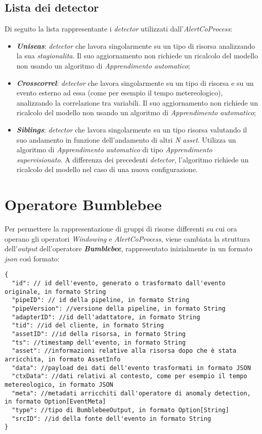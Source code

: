 \subsection{Lista dei detector}\label{sec:detector-alertcoprocess}
Di seguito la lista rappresentante i \textit{detector} utilizzati dall'\textit{AlertCoProcess}:
\begin{itemize}
	\item{\textbf{\textit{Uniseas}}: \textit{detector} che lavora singolarmente su un tipo di risorsa analizzando la sua \textit{\gls{stagionalita}}. Il suo aggiornamento non richiede un ricalcolo del modello non usando un algoritmo di \textit{\gls{Apprendimento automatico}};}
	\item{\textbf{\textit{Crosscorrel}}: \textit{detector} che lavora singolarmente su un tipo di risorsa e su un evento esterno ad essa (come per esempio il tempo metereologico), analizzando la correlazione tra variabili. Il suo aggiornamento non richiede un ricalcolo del modello non usando un algoritmo di \textit{\gls{Apprendimento automatico}};}
	\item{\textbf{\textit{Siblings}}: \textit{detector} che lavora singolarmente su un tipo risorsa valutando il suo andamento in funzione dell'andamento di altri \textit{N} \textit{asset}. Utilizza un algoritmo di \textit{\gls{Apprendimento automatico}} di tipo \textit{\gls{Apprendimento supervisionato}}. A differenza dei precedenti \textit{detector}, l'algoritmo richiede un ricalcolo del modello nel caso di una nuova configurazione.}
\end{itemize}


\section{Operatore Bumblebee}\label{sec:bbout}
Per permettere la rappresentazione di gruppi di risorse differenti su cui ora operano gli operatori \textit{Windowing} e \textit{AlertCoProcess}, viene cambiata la struttura dell'\textit{output} dell'operatore \textbf{\textit{Bumblebee}}, rappresentato inizialmente in un formato \textit{\gls{json}} così formato:

\begin{verbatim}
{
  "id": // id dell'evento, generato o trasformato dall'evento originale, in formato String
  "pipeID": // id della pipeline, in formato String
  "pipeVersion": //versione della pipeline, in formato String
  "adapterID": //id dell'adattatore, in formato String
  "tid": //id del cliente, in formato String
  "assetID": //id della risorsa, in formato String
  "ts": //timestamp dell'evento, in formato String
  "asset": //informazioni relative alla risorsa dopo che è stata arricchita, in formato AssetInfo
  "data": //payload dei dati dell'evento trasformati in formato JSON
  "ctxData": //dati relativi al contesto, come per esempio il tempo metereologico, in formato JSON
  "meta": //metadati arricchiti dall'operatore di anomaly detection, in formato Option[EventMeta]
  "type": //tipo di BumblebeeOutput, in formato Option[String]
  "srcID": //id della fonte dell'evento in formato String
}
\end{verbatim}

